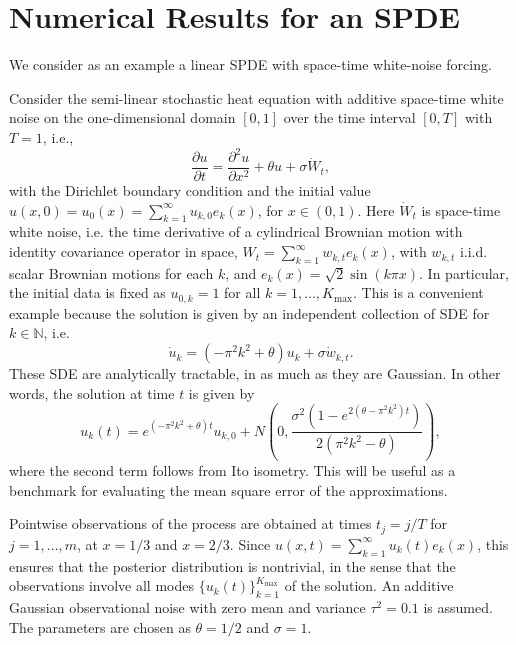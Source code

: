 \documentclass[english]{article}
\newcommand{\bbN}{\mathbb{N}}
\begin{document}
\section{Numerical Results for an SPDE}

\label{sec:numerics}


We consider as an example %
a linear SPDE with space-time white-noise forcing.


Consider the semi-linear stochastic heat equation with additive space-time white
noise on the one-dimensional domain $[0, 1]$ over the time interval $[0, T]$
with $T = 1$, i.e.,
\begin{equation}
  \frac{\partial u}{\partial t} =
  \frac{\partial^2 u}{\partial x^2} + \theta u + \sigma\dot{W}_t, %
\end{equation}
with the Dirichlet boundary condition and the initial value 
$u(x, 0) = u_0(x) = \sum_{k=1}^\infty u_{k,0} e_k(x)$,
for $x \in (0, 1)$.
Here $\dot{W}_t$ is space-time white noise, 
i.e. the time derivative of a cylindrical Brownian motion with identity covariance operator in space, 
$W_t = \sum_{k=1}^\infty w_{k,t} e_k(x)$, with $w_{k,t}$ i.i.d. scalar Brownian motions for each $k$, 
and $e_k(x)=\sqrt{2}\sin(k\pi x)$. 
In particular, the initial data is fixed as $u_{0,k}=1$ for all $k=1,\dots, K_{\max}$. 
This is a convenient example because the solution is given by an independent
collection of SDE for $k\in \bbN$, i.e.
$$
\dot{u}_k = (- \pi^2 k^2 + \theta ) u_k + \sigma \dot{w}_{k,t}.
$$
These SDE are analytically tractable, in as much as they are Gaussian.
In other words, the solution at time $t$ is given by 
$$
u_k(t) = e^{(-\pi^2 k^2 + \theta)t}u_{k,0} + N\left ( 0, \frac{\sigma^2(1-e^{2(\theta-\pi^2k^2)t})}{2(\pi^2k^2-\theta)}\right ),
$$ 
where the second term follows from Ito isometry.  
This will be useful as a benchmark for evaluating the mean square error of the 
approximations.

Pointwise observations of the process are obtained at times $t_j=j/T$ for $j=1,\dots,m$,
at $x = 1/3$ and $x = 2/3$.  
Since 
$u(x,t)=\sum_{k=1}^\infty u_k(t) e_k(x)$,
this ensures that the posterior distribution is nontrivial, 
in the sense that 
the observations involve all modes $\{u_k(t)\}_{k=1}^{K_{\max}}$ of the solution.
An additive Gaussian
observational noise with zero mean and variance $\tau^2 = 0.1$ is assumed.
The parameters %
are chosen as $\theta = 1/2$ and $\sigma = 1$. %
\end{document}
